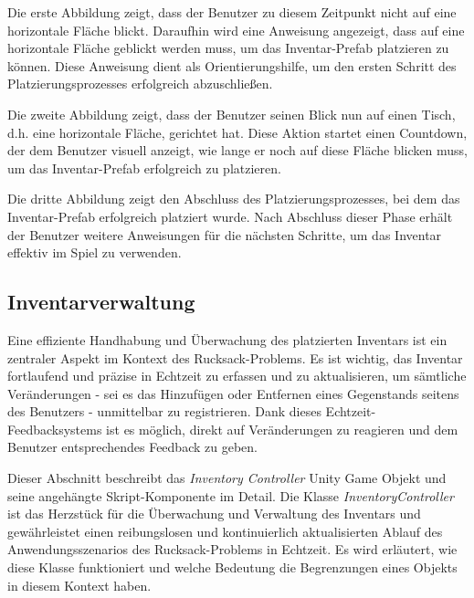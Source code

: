 \begin{itemize}
Die erste Abbildung zeigt, dass der Benutzer zu diesem Zeitpunkt nicht auf eine horizontale Fläche blickt. Daraufhin
wird eine Anweisung angezeigt, dass auf eine horizontale Fläche geblickt werden muss, um das Inventar-Prefab platzieren
zu können. Diese Anweisung dient als Orientierungshilfe, um den ersten Schritt des Platzierungsprozesses erfolgreich
abzuschließen.

Die zweite Abbildung zeigt, dass der Benutzer seinen Blick nun auf einen Tisch, d.h. eine horizontale Fläche, gerichtet
hat. Diese Aktion startet einen Countdown, der dem Benutzer visuell anzeigt, wie lange er noch auf diese Fläche blicken
muss, um das Inventar-Prefab erfolgreich zu platzieren.

Die dritte Abbildung zeigt den Abschluss des Platzierungsprozesses, bei dem das Inventar-Prefab erfolgreich platziert
wurde. Nach Abschluss dieser Phase erhält der Benutzer weitere Anweisungen für die nächsten Schritte, um das Inventar
effektiv im Spiel zu verwenden.

\subsection{Inventarverwaltung}
Eine effiziente Handhabung und Überwachung des platzierten Inventars ist ein zentraler Aspekt im Kontext des Rucksack-Problems.
Es ist wichtig, das Inventar fortlaufend und präzise in Echtzeit zu erfassen und zu aktualisieren, um sämtliche Veränderungen -
sei es das Hinzufügen oder Entfernen eines Gegenstands seitens des Benutzers - unmittelbar zu registrieren. Dank dieses
Echtzeit-Feedbacksystems ist es möglich, direkt auf Veränderungen zu reagieren und dem Benutzer entsprechendes Feedback zu geben.

Dieser Abschnitt beschreibt das \textit{Inventory Controller} Unity Game Objekt und seine angehängte Skript-Komponente
im Detail. Die Klasse \textit{InventoryController} ist das Herzstück für die Überwachung und Verwaltung des Inventars
und gewährleistet einen reibungslosen und kontinuierlich aktualisierten Ablauf des Anwendungsszenarios des Rucksack-Problems
in Echtzeit. Es wird erläutert, wie diese Klasse funktioniert und welche Bedeutung die Begrenzungen eines Objekts in
diesem Kontext haben.


\end{itemize}
